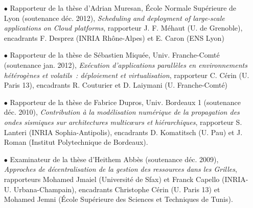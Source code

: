 \begin{itemize}
\item[$\bullet$] 
Rapporteur de la thèse d'Adrian Muresan, \'Ecole Normale Supérieure de Lyon
(soutenance déc. 2012), \textit{Scheduling and deployment of large-scale applications on 
Cloud platforms},
rapporteur J. F. Méhaut (U. de Grenoble), 
encadrants F. Desprez (INRIA Rhône-Alpes) et E. Caron (ENS Lyon)\\
\item[$\bullet$] 
Rapporteur de la thèse de Sébastien Miquée, Univ. Franche-Comté (soutenance 
jan. 2012), \textit{Exécution d'applications parallèles en environnements 
hétérogènes et volatils~: déploiement et virtualisation},
rapporteur C. Cérin (U. Paris 13), 
encadrants R. Couturier et D. Laiymani (U. Franche-Comté)\\
\item[$\bullet$] 
Rapporteur de la thèse de Fabrice Dupros, Univ. Bordeaux 1 (soutenance déc. 2010), 
\textit{Contribution à la modélisation numérique de la propagation des ondes 
sismiques sur architectures multic{\oe}urs et hiérarchiques},
rapporteur S. Lanteri (INRIA Sophia-Antipolis), 
encadrants D. Komatitsch (U. Pau) et J. Roman (Institut Polytechnique de 
Bordeaux).\\

\item[$\bullet$] 
Examinateur de la thèse d'Heithem Abbès (soutenance déc. 2009), 
\textit{Approches de décentralisation de la gestion des ressources dans les 
Grilles}, rapporteurs Mohamed Jmaiel (Université de Sfax) et Franck Capello 
(INRIA-U. Urbana-Champain), encadrants Christophe Cérin (U. Paris 13) et 
Mohamed Jemni (École Supérieure des Sciences et Techniques de Tunis).
\end{itemize}

